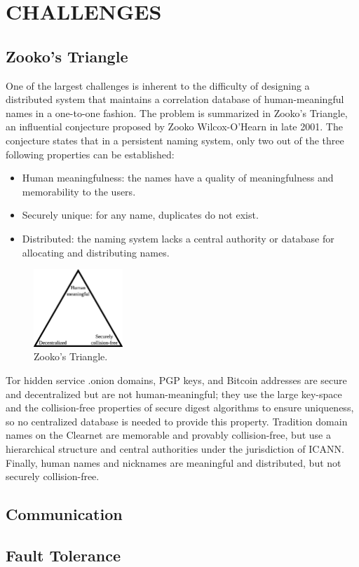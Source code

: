 
\chapter{\uppercase{Challenges}}

\section{Zooko's Triangle}

One of the largest challenges is inherent to the difficulty of designing a distributed system that maintains a correlation database of human-meaningful names in a one-to-one fashion. The problem is summarized in Zooko's Triangle, an influential conjecture proposed by Zooko Wilcox-O'Hearn in late 2001. The conjecture states that in a persistent naming system, only two out of the three following properties can be established:\cite{Ferdous2009}

\begin{itemize}
  \item Human meaningfulness: the names have a quality of meaningfulness and memorability to the users. 
  \item Securely unique: for any name, duplicates do not exist.
  \item Distributed: the naming system lacks a central authority or database for allocating and distributing names.
\end{itemize}

\begin{figure}[htbp]
	\centering
	\includegraphics[width=0.3\textwidth]{images/Zooko.eps}
	\caption{Zooko's Triangle.}
	\label{fig:figure8}
\end{figure}

Tor hidden service .onion domains, PGP keys, and Bitcoin addresses are secure and decentralized but are not human-meaningful; they use the large key-space and the collision-free properties of secure digest algorithms to ensure uniqueness, so no centralized database is needed to provide this property. Tradition domain names on the Clearnet are memorable and provably collision-free, but use a hierarchical structure and central authorities under the jurisdiction of ICANN. Finally, human names and nicknames are meaningful and distributed, but not securely collision-free.\cite{Stiegler2005}

\section{Communication}



\section{Fault Tolerance}